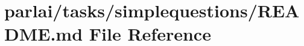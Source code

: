\hypertarget{parlai_2tasks_2simplequestions_2README_8md}{}\section{parlai/tasks/simplequestions/\+R\+E\+A\+D\+ME.md File Reference}
\label{parlai_2tasks_2simplequestions_2README_8md}
